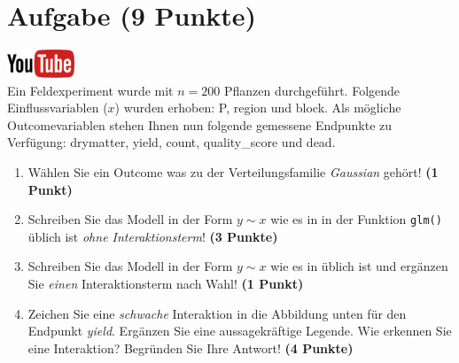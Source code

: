 \documentclass[a4paper, 9pt]{scrartcl}\usepackage[]{graphicx}\usepackage[]{xcolor}
\begin{document}
 
\clearpage

\section{Aufgabe \hfill (9 Punkte)}

\hfill\href{https://youtu.be/AwQEcQWLFCw}{\includegraphics[width =
  2cm]{img/youtube}}\\[1Ex]



Ein Feldexperiment wurde mit $n = 200$ Pflanzen durchgef{\"u}hrt. Folgende
Einflussvariablen ($x$) wurden erhoben: P, region und block. Als m{\"o}gliche Outcomevariablen stehen Ihnen nun
folgende gemessene Endpunkte zu Verf{\"u}gung: drymatter, yield, count, quality\_score und dead.

\begin{enumerate}
\item W{\"a}hlen Sie ein Outcome was zu der Verteilungsfamilie
  \textit{Gaussian} geh{\"o}rt! \textbf{(1 Punkt)}
\item Schreiben Sie das Modell in der Form $y \sim x$ wie es in \Rlogo in
  der Funktion \texttt{glm()}
  {\"u}blich ist \textit{ohne Interaktionsterm}! \textbf{(3 Punkte)}
\item Schreiben Sie das Modell in der Form $y \sim x$ wie es in \Rlogo
  {\"u}blich ist und erg{\"a}nzen Sie \textit{einen} Interaktionsterm nach Wahl! \textbf{(1 Punkt)} 
\item Zeichen Sie eine \textit{schwache}
  Interaktion in die Abbildung unten f{\"u}r den Endpunkt
  \textit{yield}. Erg{\"a}nzen Sie eine aussagekr{\"a}ftige Legende. Wie erkennen
  Sie eine Interaktion? Begr{\"u}nden Sie Ihre Antwort! \textbf{(4 Punkte)}
\end{enumerate}
\end{document}
